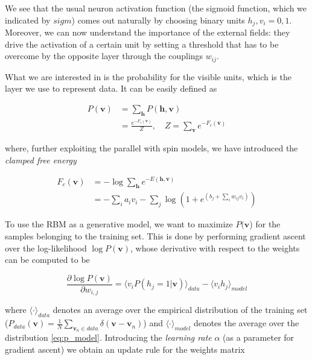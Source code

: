 \documentclass{revtex4-1}
\begin{document}
We see that the usual neuron activation function (the sigmoid function, which we indicated by \(sigm\)) comes out naturally by choosing binary units \(h_j,v_i = 0,1\). Moreover, we can now understand the importance of the external fields: they drive the activation of a certain unit by setting a threshold that has to be overcome by the opposite layer through the couplings \(w_{ij}\).

What we are interested in is the probability for the visible units, which is the layer we use to represent data. It can be easily defined as

\begin{align}
P(\textbf{v}) &  = \sum_{\textbf{h}} P(\textbf{h},\textbf{v}) \nonumber \\
& = \frac{e^{-F_c(\textbf{v})}}{Z}, \quad Z = \sum_{\textbf{v}} e^{-F_c(\textbf{v})}
\label{eq:p_model}
\end{align}

where, further exploiting the parallel with spin models, we have introduced the \textit{clamped free energy}

\begin{align}
F_c(\textbf{v}) & = -\log \sum_{\textbf{h}} e^{-E(\textbf{h},\textbf{v})} \nonumber \\
& = -\sum_i a_i v_i -\sum_j \log \left( 1 +  e^{\left( b_j + \sum_i w_{ij} v_i \right)} \right)
\end{align}

To use the RBM as a generative model, we want to maximize \(P(\textbf{v}\)) for the samples belonging to the training set. This is done by performing gradient ascent over the log-likelihood \(\log P(\textbf{v})\), whose derivative with respect to the weights can be computed to be

\begin{equation}
\frac{\partial \log P(\textbf{v})}{\partial w_{i,j}} = \langle v_i P(h_j = 1 | \mathbf{v}) \rangle_{data} - \langle v_i h_j \rangle_{model}
\label{eq:opt}
\end{equation}

where \(\langle \cdot \rangle_{data}\) denotes an average over the empirical distribution of the training set (\( \textstyle P_{data}(\mathbf{v}) = \frac{1}{N} \sum_{\mathbf{v}_n \in data} \delta (\mathbf{v} - \mathbf{v}_n ) \)) and 
\(\langle \cdot \rangle_{model}\) denotes the average over the distribution \eqref{eq:p_model}. Introducing the \textit{learning rate} \(\alpha \) (as a parameter for gradient ascent) we obtain an update rule for the weights matrix
\end{document}
